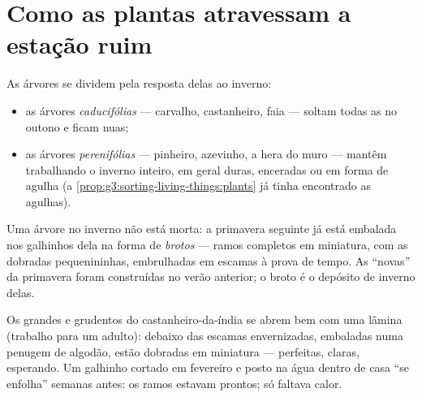 \section{Como as plantas atravessam a estação ruim}

\begin{definition}\label{def:g6:life-through-seasons:trees}
As árvores se dividem pela resposta delas ao inverno:
\begin{itemize}
  \item as árvores \emph{caducifólias} ---
        carvalho, castanheiro, faia --- soltam todas as  no
        outono e ficam nuas;
  \item as árvores \emph{perenifólias} ---
        pinheiro, azevinho, a hera do muro --- mantêm 
        trabalhando o inverno inteiro, em geral  duras,
        enceradas ou em forma de agulha (a
        \cref{prop:g3:sorting-living-things:plants} já tinha
        encontrado as agulhas).
\end{itemize}
\end{definition}

\begin{definition}[Brotos]\label{def:g6:life-through-seasons:buds}
Uma árvore  no inverno não está morta: a primavera
seguinte já está embalada nos galhinhos dela na forma de
\emph{brotos} --- ramos completos em miniatura, com as
 dobradas pequenininhas, embrulhadas em escamas à prova de
tempo. As  ``novas'' da primavera foram construídas no verão
anterior; o broto é o depósito de inverno delas.
\end{definition}

\begin{example}\label{ex:g6:life-through-seasons:bud}
Os  grandes e grudentos do castanheiro-da-índia se abrem bem
com uma lâmina (trabalho para um adulto): debaixo das escamas
envernizadas, embaladas numa penugem de algodão, estão 
dobradas em miniatura --- perfeitas, claras, esperando. Um galhinho
cortado em fevereiro e posto na água dentro de casa ``se enfolha''
semanas antes: os ramos estavam prontos; só faltava calor.
\end{example}

